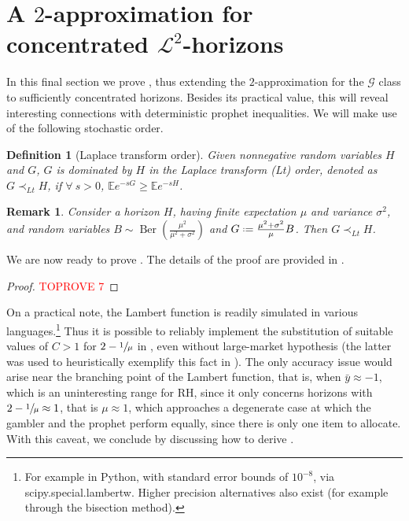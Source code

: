 \documentclass[11pt, a4paper, twoside]{article}
\newcommand*{\defeq}{\mathrel{\vcenter{\baselineskip0.5ex \lineskiplimit0pt
			\hbox{\scriptsize.}\hbox{\scriptsize.}}}=}
\newcommand{\EE}{\mathbb{E}}
\newcommand{\PGF}{\mathcal{G}}
\DeclareMathOperator{\Ber}{Ber}
\newtheorem{remark}{Remark}[section]
\newtheorem{definition}{Definition}[section]
\numberwithin{equation}{section}
\begin{document}
	\section{A $2$-approximation for concentrated $\mathcal{L}^2$-horizons}\label{L2}
	In this final section we prove , thus extending the $2$-approximation for the $\PGF$ class to sufficiently concentrated horizons. Besides its practical value, this will reveal interesting connections with deterministic prophet inequalities. We will make use of the following stochastic order.
	\begin{definition}[Laplace transform order]
		Given nonnegative random variables $H$ and $G$, $G$ is dominated by $H$ in the \emph{Laplace transform (Lt) order}, denoted as $G\prec_{Lt} H$, if $\forall\:s>0$, $\EE e^{-sG}\ge\EE e^{-sH}$.
	\end{definition}
	\begin{remark}\label{bernoulli}
		Consider a horizon $H$, having finite expectation $\mu$ and variance $\sigma^2$, and random variables $B\sim\Ber\left(\frac{\mu^2}{\mu^2+\sigma^2}\right)$ and $G\defeq\frac{\mu^2+\sigma^2}{\mu}B$. Then $G\prec_{Lt}H$.
	\end{remark}
	We are now ready to prove . The details of the proof are provided in .
	\begin{proof}\textcolor{red}{TOPROVE 7}\end{proof}
	On a practical note, the Lambert function is readily simulated in various languages.\footnote{For example in Python, with standard error bounds of $10^{-8}$, via scipy.special.lambertw. Higher precision alternatives also exist (for example through the bisection method).} Thus it is possible to reliably implement the substitution of suitable values of $C>1$ for $2-\sfrac{1}{\mu}$ in , even without large-market hypothesis (the latter was used to heuristically exemplify this fact in ). The only accuracy issue would arise near the branching point of the Lambert function, that is, when $\bar{y}\approx-1$, which is an uninteresting range for RH, since it only concerns horizons with $2-\sfrac{1}{\mu}\approx 1$, that is $\mu\approx 1$, which approaches a degenerate case at which the gambler and the prophet perform equally, since there is only one item to allocate. With this caveat, we conclude by discussing how to derive . 
	
\end{document}
